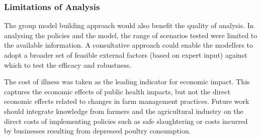 \subsubsection{Limitations of Analysis}
The group model building approach would also benefit the quality of analysis. In analysing the policies and the model, the range of scenarios tested were limited to the available information. A consultative approach could enable the modellers to adopt a broader set of feasible external factors (based on expert input) against which to test the efficacy and robustness.

The cost of illness was taken as the leading indicator for economic impact. This captures the economic effects of public health impacts, but not the direct economic effects related to changes in farm management practices. Future work should integrate knowledge from farmers and the agricultural industry on the direct costs of implementing policies such as safe slaughtering or costs incurred by businesses resulting from depressed poultry consumption.



